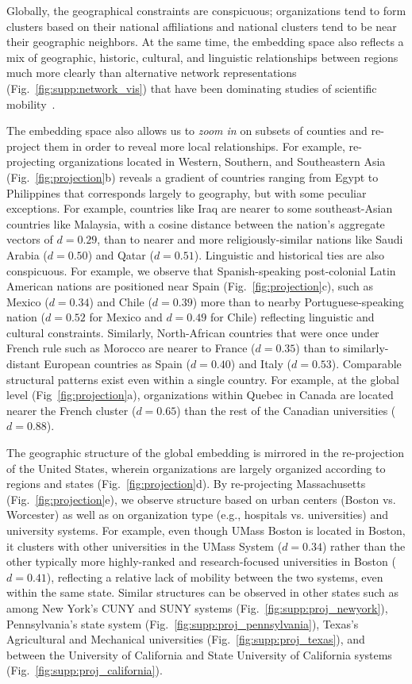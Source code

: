 \documentclass[12pt]{article} %
\begin{document}
Globally, the geographical constraints are conspicuous; organizations tend to form clusters based on their national affiliations and national clusters tend to be near their geographic neighbors. 
At the same time, the embedding space also reflects a mix of geographic, historic, cultural, and linguistic relationships between regions much more clearly than alternative network representations (Fig.~\ref{fig:supp:network_vis}) that have been dominating studies of scientific mobility~\autocite{chinchilla2018global, czaika2018globalisation}.

The embedding space also allows us to \textit{zoom in} on subsets of counties and re-project them in order to reveal more local relationships. 
For example, re-projecting organizations located in Western, Southern, and Southeastern Asia (Fig.~\ref{fig:projection}b) reveals a gradient of countries ranging from Egypt to Philippines that corresponds largely to geography, but with some peculiar exceptions. 
For example, countries like Iraq are nearer to some southeast-Asian countries like Malaysia, with a cosine distance between the nation's aggregate vectors of $d = 0.29$, than to nearer and more religiously-similar nations like Saudi Arabia ($d = 0.50$) and Qatar ($d = 0.51$). 
Linguistic and historical ties are also conspicuous.
For example, we observe that Spanish-speaking post-colonial Latin American nations are positioned near Spain (Fig.~\ref{fig:projection}c), such as Mexico ($d = 0.34$) and Chile ($d = 0.39$) more than to nearby Portuguese-speaking nation ($d = 0.52$ for Mexico and $d = 0.49$ for Chile) reflecting linguistic and cultural constraints.
Similarly, North-African countries that were once under French rule such as Morocco are nearer to France ($d =0.35$) than to similarly-distant European countries as Spain ($d = 0.40$) and Italy ($d = 0.53$). 
Comparable structural patterns exist even within a single country.
For example, at the global level (Fig~\ref{fig:projection}a), organizations within Quebec in Canada are located nearer the French cluster ($d = 0.65$) than the rest of the Canadian universities ($d = 0.88$).


The geographic structure of the global embedding is mirrored in the re-projection of the United States, wherein organizations are largely organized according to regions and states (Fig.~\ref{fig:projection}d).
By re-projecting Massachusetts (Fig.~\ref{fig:projection}e), we observe structure based on urban centers (Boston vs. Worcester) as well as on organization type (e.g., hospitals vs. universities) and university systems.
For example, even though UMass Boston is located in Boston, it clusters with  other universities in the UMass System ($d = 0.34$) rather than the other typically more highly-ranked and research-focused universities in Boston ($d = 0.41$), reflecting a relative lack of mobility between the two systems, even within the same state.
Similar structures can be observed in other states such as among New York's CUNY and SUNY systems (Fig.~\ref{fig:supp:proj_newyork}), Pennsylvania's state system (Fig.~\ref{fig:supp:proj_pennsylvania}), Texas's Agricultural and Mechanical universities (Fig.~\ref{fig:supp:proj_texas}), and between the University of California and State University of California systems (Fig.~\ref{fig:supp:proj_california}). 
\end{document}
